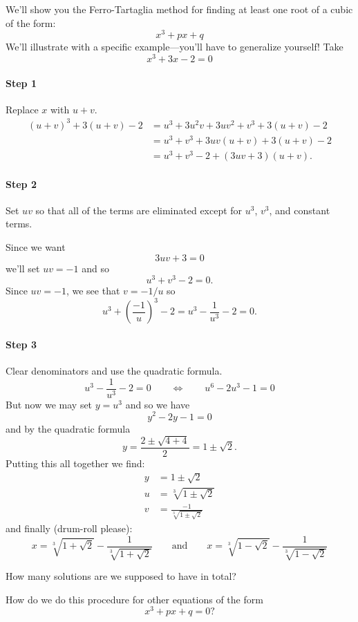 We'll show you the Ferro-Tartaglia method for finding at least one root of a cubic of the form:
\[
x^3+ px + q
\]
We'll illustrate with a specific example---you'll have to generalize
yourself! Take
\[
x^3 +3x - 2  = 0
\]
\paragraph{Step 1} Replace $x$ with $u+v$. 
\begin{align*}
(u+v)^3 + 3(u+v) - 2  &= u^3 + 3u^2v + 3uv^2 + v^3 + 3(u+v) -2 \\
&= u^3 + v^3 + 3uv(u+v) + 3(u+v) - 2\\
&= u^3 + v^3 - 2 + (3uv+3)(u+v).
\end{align*}
\paragraph{Step 2} 
Set $uv$ so that all of the terms are eliminated except for $u^3$,
$v^3$, and constant terms.  

Since we want 
\[
3uv + 3 = 0
\]
we'll set $uv = -1$ and so 
\[
u^3 + v^3 -2 = 0.
\]
Since $uv = -1$, we see that $v = -1/u$ so
\[
u^3 + \left(\frac{-1}{u}\right)^3  -2 = u^3 - \frac{1}{u^3} - 2= 0.
\]
\paragraph{Step 3} 
Clear denominators and use the quadratic formula.
\[
u^3 - \frac{1}{u^3} -2 = 0 \qquad \Leftrightarrow \qquad u^6 - 2 u^3 -1 = 0
\]
But now we may set $y = u^3$ and so we have
\[
y^2 - 2y -1 = 0
\]
and by the quadratic formula
\[
y = \frac{2 \pm \sqrt{4 + 4}}{2} = 1 \pm \sqrt{2}.
\]
Putting this all together we find:
\begin{align*}
y &= 1 \pm \sqrt{2} \\
u &= \sqrt[3]{1 \pm \sqrt{2}}\\
v &= \frac{-1}{\sqrt[3]{1 \pm \sqrt{2}}}
\end{align*}
and finally (drum-roll please):
\[
x = \sqrt[3]{1 + \sqrt{2}} - \frac{1}{\sqrt[3]{1 + \sqrt{2}}} \qquad\text{and}\qquad x = \sqrt[3]{1 - \sqrt{2}} - \frac{1}{\sqrt[3]{1 - \sqrt{2}}}
\]

\begin{question} How many solutions are we supposed to have in total?
\end{question}
\QM


\begin{question} How do we do this procedure for other equations of the form
\[
x^3 + px + q = 0?
\]
\end{question}
\QM



